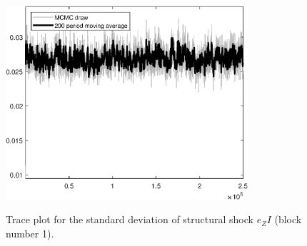 \begin{figure}[H]
\centering
  \includegraphics[width=0.8\textwidth]{BRS_fd/graphs/TracePlot_SE_e_ZI_blck_1}\\
    \caption{Trace plot for the standard deviation of structural shock ${e_ZI}$ (block number 1).}
\end{figure}
